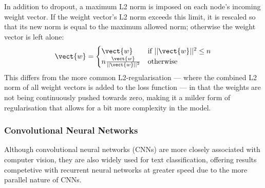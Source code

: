 In addition to dropout, a maximum L2 norm is imposed on each node's incoming
weight vector. If the weight vector's L2 norm exceeds this limit, it is rescaled
so that its new norm is equal to the maximum allowed norm; otherwise the weight
vector is left alone:
\begin{equation}
  \label{eq:norm}
  \vect{w} = \begin{cases}
    \vect{w}\,                          & \text{if } ||\vect{w}||^2 \leq n \\
    n \frac{\vect{w}}{||\vect{w}||^2} & \text{otherwise}
  \end{cases}
\end{equation}
This differs from the more common L2-regularisation --- where the combined L2
norm of all weight vectors is added to the loss function --- in that the weights
are not being continuously pushed towards zero, making it a milder form of
regularisation that allows for a bit more complexity in the model.

\subsubsection{Convolutional Neural Networks}\label{sec:conv}
Although convolutional neural networks (CNNs) are more closely associated with
computer vision, they are also widely used for text classification, offering
results competetive with recurrent neural networks\citep{cnnrnn} at greater
speed due to the more parallel nature of CNNs\citep{facebook}.

